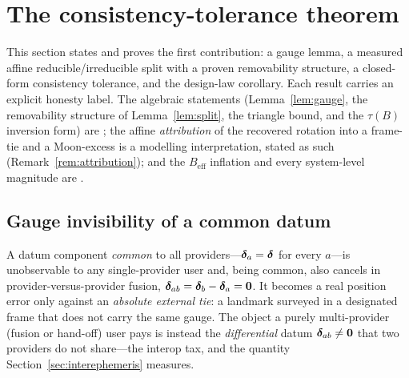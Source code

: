 \section{The consistency-tolerance theorem}
\label{sec:theorem}

This section states and proves the first contribution: a gauge lemma, a measured
affine reducible/irreducible split with a proven removability structure, a closed-form
consistency tolerance, and the design-law corollary. Each result carries an explicit
honesty label. The algebraic statements (Lemma~\ref{lem:gauge}, the removability
structure of Lemma~\ref{lem:split}, the triangle bound, and the $\tau(B)$ inversion
form) are \Proven{}; the affine \emph{attribution} of the recovered rotation into a
frame-tie and a Moon-excess is a modelling interpretation, stated as such
(Remark~\ref{rem:attribution}); and the $B_{\mathrm{eff}}$ inflation and every
system-level magnitude are \Modelled{}.

\subsection{Gauge invisibility of a common datum}

\begin{lemma}
\label{lem:gauge}
A datum component \emph{common} to all providers---$\bm{\delta}_a=\bm{\delta}$ for every
$a$---is unobservable to any single-provider user and, being common, also cancels in
provider-versus-provider fusion, $\bm{\delta}_{ab}=\bm{\delta}_b-\bm{\delta}_a=\bm 0$. It becomes a
real position error only against an \emph{absolute external tie}: a landmark surveyed
in a designated frame that does not carry the same gauge. The object a purely
multi-provider (fusion or hand-off) user pays is instead the \emph{differential} datum
$\bm{\delta}_{ab}\neq\bm 0$ that two providers do not share---the interop tax, and the
quantity Section~\ref{sec:interephemeris} measures.
\end{lemma}


